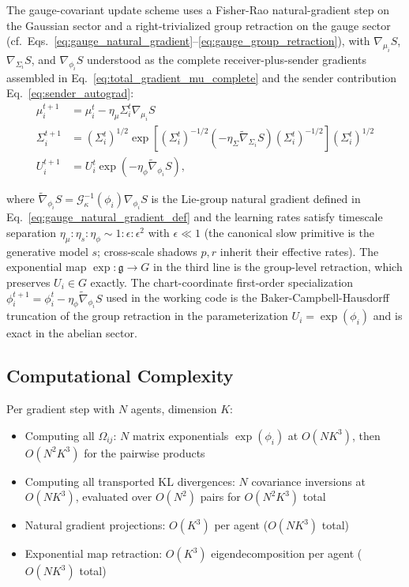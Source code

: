 \documentclass[11pt]{article}
\begin{document}
The gauge-covariant update scheme uses a Fisher-Rao natural-gradient step on the Gaussian sector and a right-trivialized group retraction on the gauge sector (cf.\ Eqs.~\ref{eq:gauge_natural_gradient}--\ref{eq:gauge_group_retraction}), with $\nabla_{\mu_i} S$, $\nabla_{\Sigma_i} S$, and $\nabla_{\phi_i} S$ understood as the complete receiver-plus-sender gradients assembled in Eq.~\eqref{eq:total_gradient_mu_complete} and the sender contribution Eq.~\eqref{eq:sender_autograd}:
\begin{align}
\mu_i^{t+1} &= \mu_i^t - \eta_\mu \Sigma_i^t \nabla_{\mu_i} S \\
\Sigma_i^{t+1} &= \left(\Sigma_i^t\right)^{1/2} \exp\left[\left(\Sigma_i^t\right)^{-1/2}\left(-\eta_\Sigma \tilde{\nabla}_{\Sigma_i} S\right)\left(\Sigma_i^t\right)^{-1/2}\right] \left(\Sigma_i^t\right)^{1/2} \\
U_i^{t+1} &= U_i^t \exp\left(-\eta_\phi \tilde{\nabla}_{\phi_i} S\right),
\end{align}

where $\tilde{\nabla}_{\phi_i} S = \mathcal{G}_\kappa^{-1}(\phi_i)\nabla_{\phi_i} S$ is the Lie-group natural gradient defined in Eq.~\ref{eq:gauge_natural_gradient_def} and the learning rates satisfy timescale separation $\eta_\mu : \eta_s : \eta_\phi \sim 1 : \epsilon : \epsilon^2$ with $\epsilon \ll 1$ (the canonical slow primitive is the generative model $s$; cross-scale shadows $p, r$ inherit their effective rates). The exponential map $\exp : \mathfrak{g} \to G$ in the third line is the group-level retraction, which preserves $U_i \in G$ exactly. The chart-coordinate first-order specialization $\phi_i^{t+1} = \phi_i^t - \eta_\phi \tilde{\nabla}_{\phi_i} S$ used in the working code is the Baker-Campbell-Hausdorff truncation of the group retraction in the parameterization $U_i = \exp(\phi_i)$ and is exact in the abelian sector.

\subsection*{Computational Complexity}

Per gradient step with $N$ agents, dimension $K$:
\begin{itemize}
\item Computing all $\Omega_{ij}$: $N$ matrix exponentials $\exp(\phi_i)$ at $O(NK^3)$, then $O(N^2 K^3)$ for the pairwise products
\item Computing all transported KL divergences: $N$ covariance inversions at $O(NK^3)$, evaluated over $O(N^2)$ pairs for $O(N^2 K^3)$ total
\item Natural gradient projections: $O(K^3)$ per agent ($O(NK^3)$ total)
\item Exponential map retraction: $O(K^3)$ eigendecomposition per agent ($O(NK^3)$ total)
\end{itemize}
\end{document}
